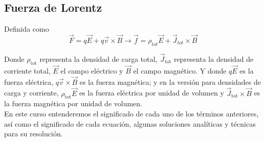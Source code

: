 \documentclass{electro}
\begin{document}
    \subsection*{Fuerza de Lorentz}
    Definida como 
    \begin{equation}
        \vec{F}=q \vec{E}+q \vec{v} \times \vec{B} \longrightarrow \vec{f}=\rho_{tot}\vec{E}+\vec{J}_{tot} \times \vec{B}
        \label{eqn:FLorentz}
    \end{equation}
    
    Donde $\rho_{\text{tot}}$ representa la densidad de carga total, $\vec{J}_{\text{tot}}$ representa la densidad de corriente total, $\vec{E}$ el campo eléctrico y $\vec{B}$ el campo magnético. Y donde $q\vec{E}$ es la fuerza eléctrica, $q \vec{v} \times \vec{B}$ es la fuerza magnética;  y en la versión para densidades de carga y corriente, $\rho_{\text{tot}}\vec{E}$ es la fuerza eléctrica por unidad de volumen y $\vec{J}_{\text{tot}} \times \vec{B}$ es la fuerza magnética por unidad de volumen.\\
    
    En este curso entenderemos el significado de cada uno de los términos anteriores, así como el significado de cada ecuación, algunas soluciones analíticas y técnicas para su resolución.
\end{document}
